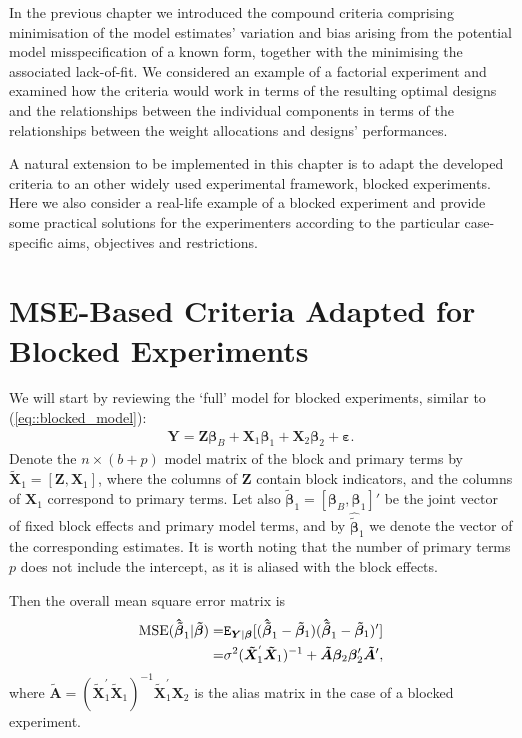 In the previous chapter we introduced the compound criteria comprising minimisation of the model estimates' variation and bias arising from the potential model misspecification of a known form, together with the minimising the associated lack-of-fit. We considered an example of a factorial experiment and examined how the criteria would work in terms of the resulting optimal designs and the relationships between the individual components in terms of the relationships between the weight allocations and designs' performances.

A natural extension to be implemented in this chapter is to adapt the developed criteria to an other widely used experimental  framework, blocked experiments. Here we also consider a real-life example of a blocked experiment and provide some practical solutions for the experimenters according to the particular case-specific aims, objectives and restrictions.

\section{MSE-Based Criteria Adapted for Blocked Experiments}

We will start by reviewing the `full' model for blocked experiments, similar to (\ref{eq::blocked_model}):
\begin{align*}
\bm{Y}=\bm{Z\beta}_{B}+\bm{X}_{1}\bm{\beta}_{1}+\bm{X}_{2}\bm{\beta}_{2}+\bm{\varepsilon}.
\end{align*}
Denote the $n\times(b+p)$ model matrix of the block and primary terms by $\tilde{\bm{X}}_{1}=[\bm{Z},\bm{X}_{1}]$, where the columns of $\bm{Z}$ contain block indicators, and the columns of $\bm{X}_{1}$ correspond to primary terms. Let also $\bm{\tilde{\beta}}_1=[\bm{\beta}_{B},\bm{\beta}_{1}]'$ be the joint vector of fixed block effects and primary model terms, and by $\bm{\hat{\tilde{\beta}}}_1$ we denote the vector of the corresponding estimates. It is worth noting that the number of primary terms $p$ does not include the intercept, as it is aliased with the block effects.

Then the overall mean square error matrix is
\begin{align}
\label{eq::MSE_b}
\mbox{MSE}(\bm{\hat{\tilde{\beta}}}_1|\bm{\tilde{\beta}})=&\mathtt{E}_{\bm{Y}|\bm{\beta}}[(\bm{\hat{\tilde{\beta}}}_1-\bm{\tilde{\beta}}_1)(\bm{\hat{\tilde{\beta}}}_1-\bm{\tilde{\beta}}_1)'] \notag\\=&\sigma^2(\bm{\tilde{X}}_1^{'}\bm{\tilde{X}}_1)^{-1}+\bm{\tilde{A}}\bm{\beta}_2\bm{\beta}_2'\bm{\tilde{A}}', 
\end{align}
where $\bm{\tilde{A}}=(\bm{\tilde{X}}_1^{'}\bm{\tilde{X}}_1)^{-1}\bm{\tilde{X}}_1^{'}\bm{X}_2$ is the alias matrix in the case of a blocked experiment.

